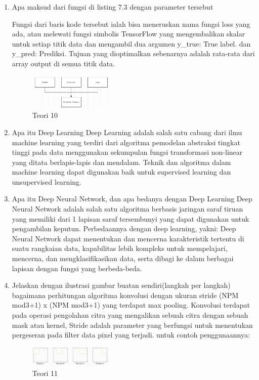 \begin{enumerate}
\item Apa maksud dari fungsi di listing 7.3 dengan parameter tersebut
\hfill\break

Fungsi dari baris kode tersebut ialah bisa meneruskan nama fungsi loss yang ada, atau melewati fungsi simbolis TensorFlow yang mengembalikan skalar untuk setiap titik data dan mengambil dua argumen y\_true: True label. dan  y\_pred: Prediksi. Tujuan yang dioptimalkan sebenarnya adalah rata-rata dari array output di semua titik data.
\begin{figure}[H]
\centering
	\includegraphics[width=4cm]{figures/1174075/7/10.jpg}
\caption{Teori 10}
\end{figure}

\item Apa itu Deep Learning
\hfill\break
Deep Learning adalah salah satu cabang dari ilmu machine learning yang terdiri dari algoritma pemodelan abstraksi tingkat tinggi pada data menggunakan sekumpulan fungsi transformasi non-linear yang ditata berlapis-lapis dan mendalam. Teknik dan algoritma dalam machine learning dapat digunakan baik untuk supervised learning dan unsupervised learning.

\item Apa itu Deep Neural Network, dan apa bedanya dengan Deep Learning
\hfill\break
Deep Neural Network adalah salah satu algoritma berbasis jaringan saraf tiruan yang memiliki dari 1 lapisan saraf tersembunyi yang dapat digunakan untuk pengambilan keputun. Perbedaannya dengan deep learning, yakni: Deep Neural Network dapat menentukan dan mencerna karakteristik tertentu di suatu rangkaian data, kapabilitas lebih kompleks untuk mempelajari, mencerna, dan mengklasifikasikan data, serta dibagi ke dalam berbagai lapisan dengan fungsi yang berbeda-beda.

\item Jelaskan dengan ilustrasi gambar buatan sendiri(langkah per langkah) bagaimana perhitungan algoritma konvolusi dengan ukuran stride (NPM mod3+1) x (NPM mod3+1) yang terdapat max pooling.
\hfill\break
Konvolusi terdapat pada operasi pengolahan citra yang mengalikan sebuah citra dengan sebuah mask atau kernel, Stride adalah parameter yang berfungsi untuk menentukan pergeseran pada filter data pixel yang terjadi. untuk contoh penggunaannya:
\begin{figure}[H]
\centering
	\includegraphics[width=4cm]{figures/1174075/7/11.jpg}
\caption{Teori 11}
\end{figure}




\end{enumerate}
